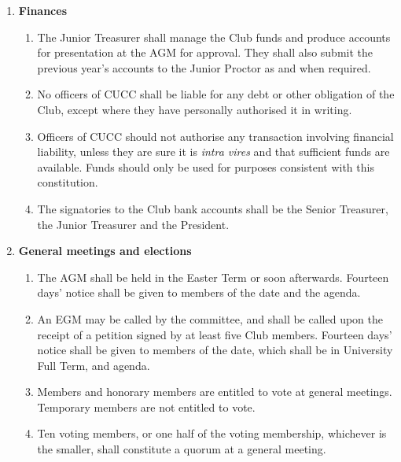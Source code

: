 \documentclass[a4paper,11pt]{article}
\begin{document}
\begin{enumerate}
\begin{enumerate}
\end{enumerate}

\item {\bf Finances}

\begin{enumerate}

\item The Junior Treasurer shall manage the Club funds and produce accounts for
presentation at the AGM for approval.  They shall also submit the previous year's
accounts to the Junior Proctor as and when required. 

\item No officers of CUCC shall be liable for any debt or other obligation of
the Club, except where they have personally authorised it in writing. 

\item Officers of CUCC should not authorise any transaction involving financial
liability, unless they are sure it is {\em intra vires} and that sufficient
funds are available. Funds should only be used for purposes consistent with
this constitution.

\item The signatories to the Club bank accounts shall be the Senior Treasurer,
the Junior Treasurer and the President.

\end{enumerate}

\item {\bf General meetings and elections}

\begin{enumerate}

\item The AGM shall be held in the Easter Term or soon afterwards.  Fourteen
days' notice shall be given to members of the date and the agenda.

\item An EGM may be called by the committee, and shall be called upon the
receipt of a petition signed by at least five Club members. Fourteen days'
notice shall be given to members of the date, which shall be in University Full
Term, and agenda.

\item Members and honorary members are entitled to vote at general meetings.
Temporary members are not entitled to vote.

\item Ten voting members, or one half of the voting membership, whichever is
the smaller, shall constitute a quorum at a general meeting. 


\end{enumerate}
\end{enumerate}
\end{document}
